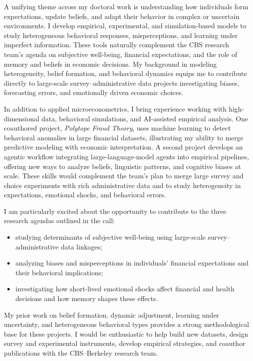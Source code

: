 \documentclass[11pt]{article}
\begin{document}
A unifying theme across my doctoral work is understanding how individuals form expectations, update beliefs, and adapt their behavior in complex or uncertain environments. I develop empirical, experimental, and simulation-based models to study heterogeneous behavioral responses, misperceptions, and learning under imperfect information. These tools naturally complement the CBS research team’s agenda on subjective well-being, financial expectations, and the role of memory and beliefs in economic decisions. My background in modeling heterogeneity, belief formation, and behavioral dynamics equips me to contribute directly to large-scale survey--administrative data projects investigating biases, forecasting errors, and emotionally driven economic choices.

In addition to applied microeconometrics, I bring experience working with high-dimensional data, behavioral simulations, and AI-assisted empirical analysis. One coauthored project, \emph{Polytope Fraud Theory}, uses machine learning to detect behavioral anomalies in large financial datasets, illustrating my ability to merge predictive modeling with economic interpretation. A second project develops an agentic workflow integrating large-language-model agents into empirical pipelines, offering new ways to analyze beliefs, linguistic patterns, and cognitive biases at scale. These skills would complement the team’s plan to merge large survey and choice experiments with rich administrative data and to study heterogeneity in expectations, emotional shocks, and behavioral errors.

I am particularly excited about the opportunity to contribute to the three research agendas outlined in the call:
\begin{itemize}
    \item studying determinants of subjective well-being using large-scale survey–administrative data linkages;
    \item analyzing biases and misperceptions in individuals’ financial expectations and their behavioral implications;
    \item investigating how short-lived emotional shocks affect financial and health decisions and how memory shapes these effects.
\end{itemize}
My prior work on belief formation, dynamic adjustment, learning under uncertainty, and heterogeneous behavioral types provides a strong methodological base for these projects. I would be enthusiastic to help build new datasets, design survey and experimental instruments, develop empirical strategies, and coauthor publications with the CBS–Berkeley research team.
\end{document}
